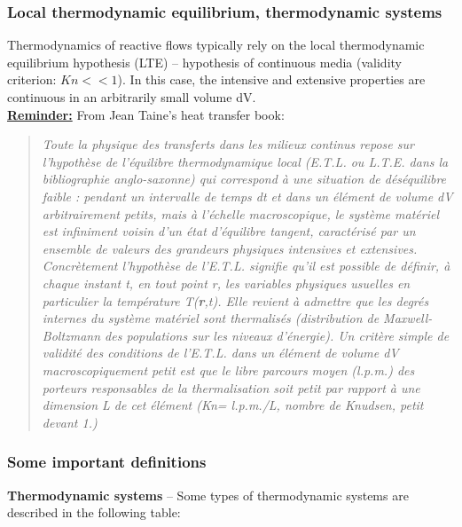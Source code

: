 \documentclass[a4paper,11pt]{article}
\begin{document}
\subsubsection{Local thermodynamic equilibrium, thermodynamic systems}
Thermodynamics of reactive flows typically rely on the local thermodynamic equilibrium hypothesis (LTE) -- hypothesis of continuous media (validity criterion: $Kn<<1$). In this case, the intensive and extensive properties are continuous in an arbitrarily small volume dV.
\vspace{8pt}
\\
\underline{\textbf{\small Reminder:}} From Jean Taine's heat transfer book:
\begin{quote}
\emph{
Toute la physique des transferts dans les milieux continus repose sur l'hypothèse de l'équilibre thermodynamique local (E.T.L. ou L.T.E. dans la bibliographie anglo-saxonne) qui correspond à une situation de déséquilibre faible : pendant un intervalle de temps dt et dans un élément de volume dV arbitrairement petits, mais à l'échelle macroscopique, le système matériel est infiniment voisin d'un état d'équilibre tangent, caractérisé par un ensemble de valeurs des grandeurs physiques intensives et extensives.\\ Concrètement l'hypothèse de l'E.T.L. signifie qu'il est possible de définir, à chaque instant t, en tout point r, les variables physiques usuelles en particulier la température T(\textbf{r},t). Elle revient à admettre que les degrés internes du système matériel sont thermalisés (distribution de Maxwell-Boltzmann des populations sur les niveaux d'énergie). Un critère simple de validité des conditions de l'E.T.L. dans un élément de volume dV macroscopiquement petit est que le libre parcours moyen (l.p.m.) des porteurs responsables de la thermalisation soit petit par rapport à une dimension L de cet élément (Kn= l.p.m./L, nombre de Knudsen, petit devant 1.)
}
\end{quote}

\subsubsection{Some important definitions}
\textbf{Thermodynamic systems} --  Some types of thermodynamic systems are described in the following table:
\end{document}

